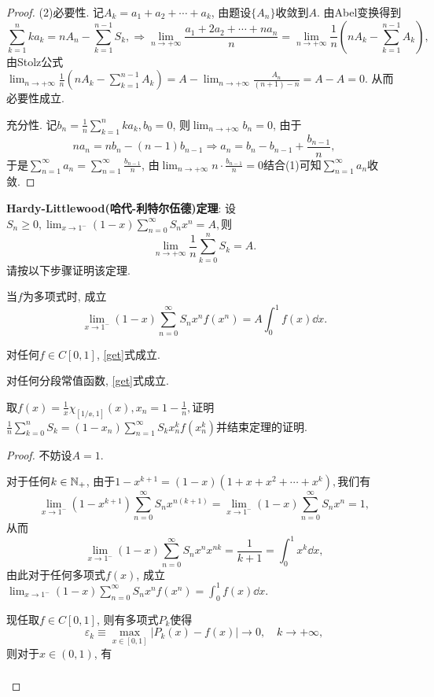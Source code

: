 \begin{quizb}
\begin{proof}
(2)必要性. 记\(A_k=a_1+a_2+\cdots+a_k\), 由题设\(\{A_n\}\)收敛到\(A\). 由Abel变换得到\[\sum_{k=1}^{n}ka_k=nA_n-\sum_{k=1}^{n-1}S_k,\Rightarrow\lim_{n\rightarrow+\infty}\frac{a_1+2a_2+\cdots+na_n}{n}=\lim_{n\rightarrow+\infty}\frac{1}{n}\left(nA_k-\sum_{k=1}^{n-1}A_k\right),\]由Stolz公式\(\lim_{n\rightarrow+\infty}\frac{1}{n}\left(nA_k-\sum_{k=1}^{n-1}A_k\right)=A-\lim_{n\rightarrow+\infty}\frac{A_n}{(n+1)-n}=A-A=0\). 从而必要性成立.

充分性. 记\(b_n=\frac{1}{n}\sum_{k=1}^{n}ka_k,b_0=0\), 则\(\lim_{n\rightarrow+\infty}b_n=0\), 由于\[na_n=nb_n-(n-1)b_{n-1}\Rightarrow a_n=b_{n}-b_{n-1}+\frac{b_{n-1}}{n},\]于是\(\sum_{n=1}^{\infty}a_n=\sum_{n=1}^{\infty}\frac{b_{n-1}}{n}\), 由\(\lim_{n\rightarrow+\infty}n\cdot\frac{b_{n-1}}{n}=0\)结合(1)可知\(\sum_{n=1}^{\infty}a_n\)收敛.
\end{proof}
\woe \textbf{Hardy-Littlewood(哈代-利特尔伍德)定理}: 设\(S_n\geqslant 0,\lim_{x\rightarrow 1^-}(1-x)\sum_{n=0}^{\infty}S_nx^n=A,\)则\[\lim_{n\rightarrow+\infty}\frac{1}{n}\sum_{k=0}^{n}S_k=A.\]请按以下步骤证明该定理.
\begin{compactenum}[(1)]
\item 当\(f\)为多项式时, 成立\begin{equation}\label{get}\tag{$\clubsuit$}
\lim_{x\rightarrow 1^-}(1-x)\sum_{n=0}^{\infty}S_nx^nf(x^n)=A\int_{0}^{1}f(x)\dd x.
\end{equation}
\item 对任何\(f\in C[0,1]\), \eqref{get}式成立.
\item 对任何分段常值函数, \eqref{get}式成立.
\item 取\(f(x)=\frac{1}{x}\chi_{[1/\ee,1]}(x), x_n=1-\frac{1}{n},\)证明\(\frac{1}{n}\sum_{k=0}^{n}S_k=(1-x_n)\sum_{n=1}^{\infty}S_kx_n^kf(x_n^k)\)并结束定理的证明.
\end{compactenum}
\begin{proof}
不妨设\(A=1\).
\begin{asparaenum}[\bfseries (1)]
\item 对于任何\(k\in\mathbb{N}_+\), 由于\(1-x^{k+1}=(1-x)(1+x+x^2+\cdots+x^k),\)我们有\[\lim_{x\rightarrow 1^-}(1-x^{k+1})\sum_{n=0}^{\infty}S_nx^{n(k+1)}=\lim_{x\rightarrow 1^-}(1-x)\sum_{n=0}^{\infty}S_nx^n=1,\]从而\[\lim_{x\rightarrow 1^-}(1-x)\sum_{n=0}^{\infty}S_nx^nx^{nk}=\frac{1}{k+1}=\int_{0}^{1}x^k\dd x,\]由此对于任何多项式\(f(x)\), 成立\(\lim_{x\rightarrow 1^-}(1-x)\sum_{n=0}^{\infty}S_nx^nf\left(x^n\right)=\int_{0}^{1}f(x)\dd x\).
\item 现任取\(f\in C[0,1]\), 则有多项式\(P_k\)使得\[\varepsilon_k\equiv\max_{x\in[0,1]}\left|P_k(x)-f(x)\right|\rightarrow 0,\quad k\rightarrow+\infty,\]则对于\(x\in(0,1)\), 有\[\begin{split}

\end{split}\]
\end{asparaenum}
\end{proof}
\end{quizb}
